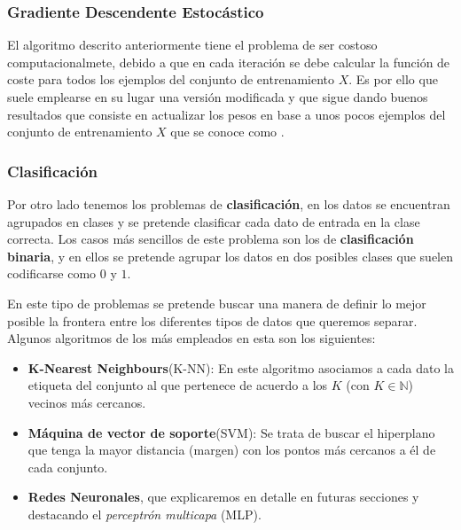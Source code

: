         \subsubsection{Gradiente Descendente Estocástico}
    
            \noindent El algoritmo descrito anteriormente tiene el problema de ser costoso computacionalmete, debido a que en cada iteración se debe calcular la función de coste para todos los ejemplos del conjunto de entrenamiento $X$. Es por ello que suele emplearse en su lugar una versión modificada y que sigue dando buenos resultados que consiste en actualizar los pesos en base a unos pocos ejemplos del conjunto de entrenamiento $X$ que se conoce como .
        
            
        \subsubsection{Clasificación}
            \noindent Por otro lado tenemos los problemas de \textbf{clasificación}, en los datos se encuentran agrupados en clases y se pretende clasificar cada dato de entrada en la clase correcta. Los casos más sencillos de este problema son los de \textbf{clasificación binaria}, y en ellos se pretende agrupar los datos en dos posibles clases que suelen codificarse como $0$ y $1$. 

            \medskip

            \noindent En este tipo de problemas se pretende buscar una manera de definir lo mejor posible la frontera entre los diferentes tipos de datos que queremos separar. Algunos algoritmos de los más empleados en esta son los siguientes: 

             \begin{itemize}
                \item \textbf{K-Nearest Neighbours}(K-NN): En este algoritmo asociamos a cada dato la etiqueta del conjunto al que pertenece de acuerdo a los $K$ (con $K \in \mathbb{N}$) vecinos más cercanos.
                \item \textbf{Máquina de vector de soporte}(SVM): Se trata de buscar el hiperplano que tenga la mayor distancia (margen) con los pontos más cercanos a él de cada conjunto.
                \item \textbf{Redes Neuronales}, que explicaremos en detalle en futuras secciones y destacando el \textit{perceptrón multicapa} (MLP).
             \end{itemize}


